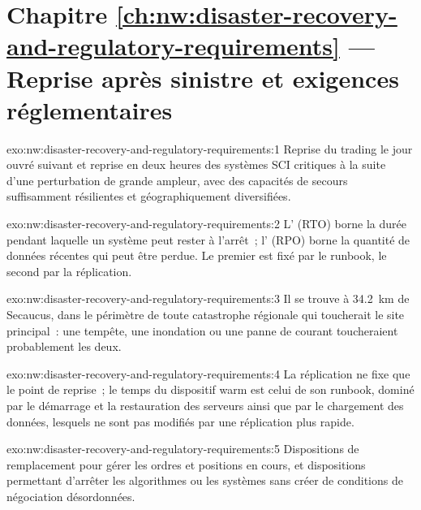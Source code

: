 \section*{Chapitre \ref{ch:nw:disaster-recovery-and-regulatory-requirements} --- Reprise après sinistre et exigences réglementaires}

\begin{solution}{exo:nw:disaster-recovery-and-regulatory-requirements:1}
Reprise du trading le jour ouvré suivant et reprise en deux heures des systèmes SCI critiques à la suite d'une perturbation de grande ampleur,
avec des capacités de secours suffisamment résilientes et géographiquement diversifiées.
\end{solution}

\begin{solution}{exo:nw:disaster-recovery-and-regulatory-requirements:2}
L' (RTO) borne la durée pendant laquelle un système peut rester à l'arrêt~; l' (RPO)
borne la quantité de données récentes qui peut être perdue. Le premier est fixé par le runbook, le second par la réplication.
\end{solution}

\begin{solution}{exo:nw:disaster-recovery-and-regulatory-requirements:3}
Il se trouve à \qty{34.2}{\kilo\metre} de Secaucus, dans le périmètre de toute catastrophe régionale qui toucherait le site principal~:
une tempête, une inondation ou une panne de courant toucheraient probablement les deux.
\end{solution}

\begin{solution}{exo:nw:disaster-recovery-and-regulatory-requirements:4}
La réplication ne fixe que le point de reprise~; le temps du dispositif warm est celui de son runbook, dominé par le démarrage et la restauration des serveurs ainsi que par le chargement des données,
lesquels ne sont pas modifiés par une réplication plus rapide.
\end{solution}

\begin{solution}{exo:nw:disaster-recovery-and-regulatory-requirements:5}
Dispositions de remplacement pour gérer les ordres et positions en cours, et dispositions permettant d'arrêter les algorithmes ou les systèmes
sans créer de conditions de négociation désordonnées.
\end{solution}

